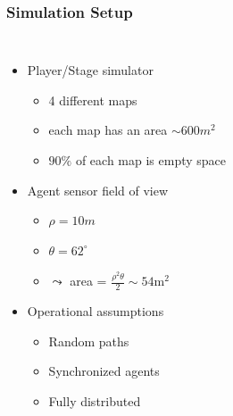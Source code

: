 \begin{frame}
	\frametitle{Simulation Setup}
	\begin{columns}[T]
		
		\begin{itemize}
			\item Player/Stage simulator
				\begin{itemize}
					\item 4 different maps
					\item each map has an area $\sim 600 m^2$
					\item $90\%$ of each map is empty space
				\end{itemize}
				\vspace{0.4cm}
			\item Agent sensor field of view
				\begin{itemize}
					\item $\rho = 10m$
					\item $\theta = 62^{\circ}$
					\item $\leadsto$ area = $\frac{\rho^2\theta}{2} \sim 54 \mathrm{m}^2$
				\end{itemize}
				\vspace{0.4cm}
			\item Operational assumptions
				\begin{itemize}
					\item Random paths
					\item Synchronized agents
					\item Fully distributed
				\end{itemize}
		\end{itemize}
		

\end{columns}
\end{frame}
